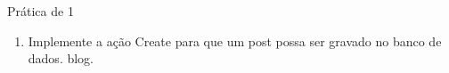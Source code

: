 \begin{frame}[fragile,t]{Prática de 1}
	\begin{enumerate}
        \item Implemente a ação Create para que um post possa ser gravado
        no banco de dados. 
        blog.
	\end{enumerate}
\end{frame}